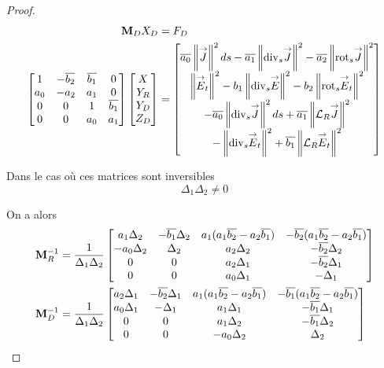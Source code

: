 \begin{proof}
    \begin{align*}
      \mathbf{M}_D  X_D & =  F_D
      \\
      \begin{bmatrix}
        1 & -{\overline{b_2}} & {\overline{b_1}} & 0
        \\
        a_0 & -a_2 & a_1 & 0
        \\
        0 & 0 & 1 & {\overline{b_1}}
        \\
        0 & 0 & a_0 & a_1
      \end{bmatrix}
      \begin{bmatrix}
        X
        \\
        Y_R
        \\
        Y_D
        \\
        Z_D
      \end{bmatrix}
      & =
      \begin{bmatrix}
        {\overline{a_0}} \left\lVert{\overset{\rightarrow}{J}}\right\rVert^2ds - {\overline{a_1}} \left\lVert{\operatorname{div}_s} {\overset{\rightarrow}{J}}\right\rVert^2 - {\overline{a_2}} \left\lVert{{\operatorname{rot}}_s} {\overset{\rightarrow}{J}}\right\rVert^2  \\
        \left\lVert{\overset{\rightarrow}{E}}_t\right\rVert^2   - b_1 \left\lVert{\operatorname{div}_s} {\overset{\rightarrow}{E}} \right\rVert^2  - b_2 \left\lVert{{\operatorname{rot}}_s} {\overset{\rightarrow}{E}}_t\right\rVert^2  \\
        -{\overline{a_0}} \left\lVert{\operatorname{div}_s} {\overset{\rightarrow}{J}}\right\rVert^2ds + {\overline{a_1}} \left\lVert{\mathcal{L}_R} {\overset{\rightarrow}{J}}\right\rVert^2  \\
        -\left\lVert{\operatorname{div}_s} {\overset{\rightarrow}{E}}_t\right\rVert^2   + {\overline{b_1}} \left\lVert{\mathcal{L}_R} {\overset{\rightarrow}{E}}_t\right\rVert^2 
      \end{bmatrix}
    \end{align*}

    Dans le cas où ces matrices sont inversibles
    \begin{equation*}
      \label{eq:unicite:ci3:csu3-cn-det}
      \Delta_1\Delta_2 \not = 0
    \end{equation*}

    On a alors
    \begin{align*}
      \mathbf{M}_R^{-1} & =\dfrac{1}{\Delta_1\Delta_2}
      \begin{bmatrix}
        a_1 \Delta_2 & -{\overline{b_1}}\Delta_2 & a_1(a_1{\overline{b_2}}-a_2{\overline{b_1}}) & -{\overline{b_2}}(a_1{\overline{b_2}}-a_2{\overline{b_1}})
        \\
        -a_0 \Delta_2 & \Delta_2 & a_2\Delta_2 & -{\overline{b_2}}\Delta_2
        \\
        0 & 0 & a_2\Delta_1 & -{\overline{b_2}}\Delta_1
        \\
        0 & 0 & a_0\Delta_1 & -\Delta_1
      \end{bmatrix}
      \\
      \mathbf{M}_D^{-1} & =\dfrac{1}{\Delta_1\Delta_2}
      \begin{bmatrix}
        a_2 \Delta_1 & -{\overline{b_2}}\Delta_1 & a_1(a_1{\overline{b_2}}-a_2{\overline{b_1}}) & -{\overline{b_1}}(a_1{\overline{b_2}}-a_2{\overline{b_1}})
        \\
        a_0 \Delta_1 & -\Delta_1 & a_1\Delta_1 & -{\overline{b_1}}\Delta_1
        \\
        0 & 0 & a_1\Delta_2 & -{\overline{b_1}}\Delta_2
        \\
        0 & 0 & -a_0\Delta_2 & \Delta_2
      \end{bmatrix}
    \end{align*}
    

\end{proof}
